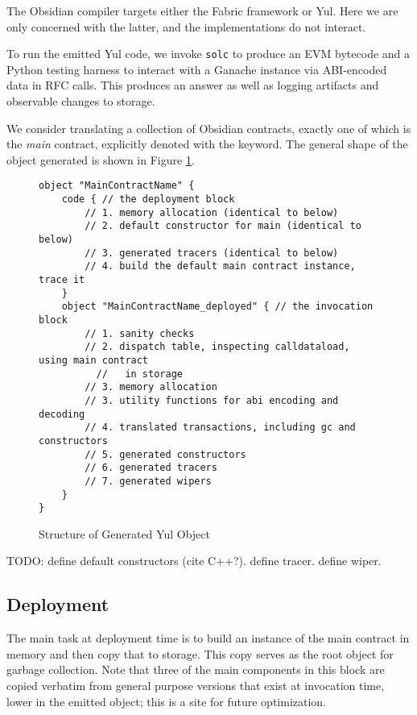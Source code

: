 The Obsidian compiler targets either the Fabric framework or Yul. Here we
are only concerned with the latter, and the implementations do not
interact.

To run the emitted Yul code, we invoke \texttt{solc} to produce an EVM
bytecode and a Python testing harness to interact with a Ganache instance
via ABI-encoded data in RFC calls. This produces an answer as well as
logging artifacts and observable changes to storage.

We consider translating a collection of Obsidian contracts, exactly one of
which is the \emph{main} contract, explicitly denoted with the
 keyword. The general shape of the object generated is shown
in Figure \ref{code.1}.

\begin{figure}[hbtp]
    \caption{Structure of Generated Yul Object}
    \label{code.1}
    \begin{lstlisting}[language=yul,frame=single]
object "MainContractName" {
    code { // the deployment block
        // 1. memory allocation (identical to below)
        // 2. default constructor for main (identical to below)
        // 3. generated tracers (identical to below)
        // 4. build the default main contract instance, trace it
    }
    object "MainContractName_deployed" { // the invocation block
        // 1. sanity checks
        // 2. dispatch table, inspecting calldataload, using main contract
          //   in storage
        // 3. memory allocation
        // 3. utility functions for abi encoding and decoding
        // 4. translated transactions, including gc and constructors
        // 5. generated constructors
        // 6. generated tracers
        // 7. generated wipers
    }
}
    \end{lstlisting}
\end{figure}

TODO: define default constructors (cite C++?). define tracer. define wiper.

\subsection{Deployment}

The main task at deployment time is to build an instance of the main
contract in memory and then copy that to storage. This copy serves as the
root object for garbage collection. Note that three of the main components
in this block are copied verbatim from general purpose versions that exist
at invocation time, lower in the emitted object; this is a site for future
optimization.

